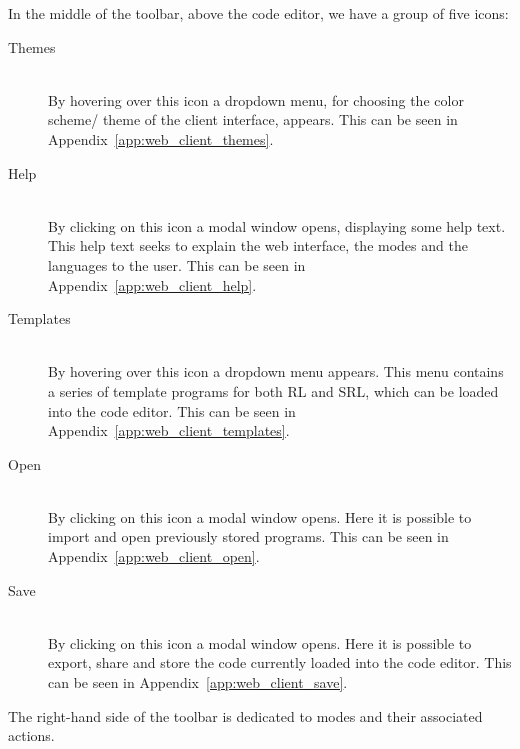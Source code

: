 In the middle of the toolbar, above the code editor, we have a group of five icons:
\begin{description}

  \item[ Themes]~\\
    By hovering over this icon a dropdown menu, for choosing the color scheme/ theme of the client interface, appears. This can be seen in Appendix~\ref{app:web_client_themes}.

  \item[ Help]~\\
    By clicking on this icon a modal window opens, displaying some help text. This help text seeks to explain the web interface, the modes and the languages to the user.
    This can be seen in Appendix~\ref{app:web_client_help}.

  \item[ Templates]~\\
    By hovering over this icon a dropdown menu appears. This menu contains a series of template programs for both RL and SRL, which can be loaded into the code editor.
    This can be seen in Appendix~\ref{app:web_client_templates}.

  \item[ Open]~\\
    By clicking on this icon a modal window opens. Here it is possible to import and open previously stored programs.
    This can be seen in Appendix~\ref{app:web_client_open}.

  \item[ Save]~\\
    By clicking on this icon a modal window opens. Here it is possible to export, share and store the code currently loaded into the code editor.
    This can be seen in Appendix~\ref{app:web_client_save}.

\end{description}
The right-hand side of the toolbar is dedicated to modes and their associated actions.

